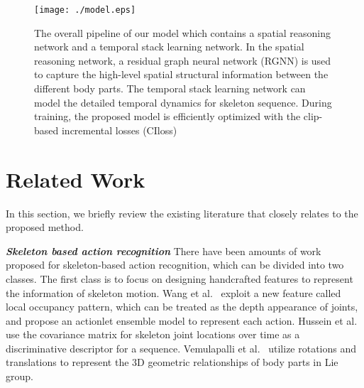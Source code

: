 \documentclass[runningheads]{llncs}
\begin{document}
\begin{figure}[!t]
\centering
\texttt{[image: ./model.eps]}
\caption{The overall pipeline of our model which contains a spatial reasoning network and a temporal stack learning network. In the spatial reasoning network, a residual graph neural network (RGNN) is used to capture the high-level spatial structural information between the different body parts. The temporal stack learning network can model the detailed temporal dynamics for skeleton sequence. During training, the proposed model is efficiently optimized with the clip-based incremental losses (CIloss) }
\label{model_pipeline}
\end{figure}

\section{Related Work}
\label{Related Work}
In this section, we briefly review the existing literature that closely relates to the proposed method.

\textbf{\emph{Skeleton based action recognition}} \hspace{3mm}
There have been amounts of work proposed for skeleton-based action recognition, which can be divided into two classes. The first class is to focus on designing handcrafted features to represent the information of skeleton motion. Wang et al.~\cite{Wang2012Mining} exploit a new feature called local occupancy pattern, which can be treated as the depth appearance of joints, and propose an actionlet ensemble model to represent each action. Hussein et al.~\cite{Hussein2013Human} use the covariance matrix for skeleton joint locations over time as a discriminative descriptor for a sequence. Vemulapalli et al.~\cite{Raviteja2014Human} utilize rotations and translations to represent the 3D geometric relationships of body parts in Lie group.
\end{document}
